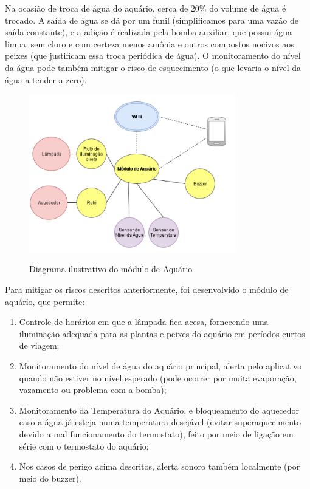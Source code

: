 Na ocasião de troca de água do aquário, cerca de 20\% do volume de água é trocado. A saída de água se dá por um funil (simplificamos para uma vazão de saída constante), e a adição é realizada pela bomba auxiliar, que possui água limpa, sem cloro e com certeza menos amônia e outros compostos nocivos aos peixes (que justificam essa troca periódica de água). O monitoramento do nível da água pode também mitigar o risco de esquecimento (o que levaria o nível da água a tender a zero).

\begin{figure}[H]
	\centering
	\caption{Diagrama ilustrativo do módulo de Aquário}
	\includegraphics[width=0.8\textwidth]{diagramaAquario}
	\label{fig:diagramaAquario}
\end{figure}

Para mitigar os riscos descritos anteriormente, foi desenvolvido o módulo de aquário, que permite:

\begin{enumerate}
	\item Controle de horários em que a lâmpada fica acesa, fornecendo uma iluminação adequada para as plantas e peixes do aquário em períodos curtos de viagem;
	\item Monitoramento do nível de água do aquário principal, alerta pelo aplicativo quando não estiver no nível esperado (pode ocorrer por muita evaporação, vazamento ou problema com a bomba);
	\item Monitoramento da Temperatura do Aquário, e bloqueamento do aquecedor caso a água já esteja numa temperatura desejável (evitar superaquecimento devido a mal funcionamento do termostato), feito por meio de ligação em série com o termostato do aquário;
	\item Nos casos de perigo acima descritos, alerta sonoro também localmente (por meio do buzzer).
	
\end{enumerate}

